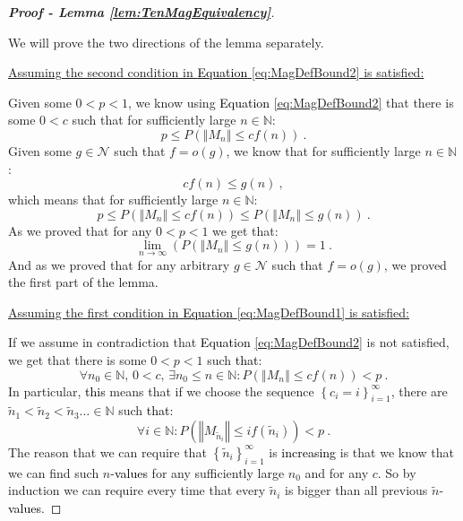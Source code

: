 \documentclass[10pt,a4paper]{amsart}
\begin{document}
\begin{proof}[\textbf{Proof - Lemma \ref{lem:TenMagEquivalency}}]
\

We will prove the two directions of the lemma separately.

\underline{Assuming the second condition in \textcolor{black}{Equation} \ref{eq:MagDefBound2} is satisfied:}

Given some \(0<p<1\), we know using \textcolor{black}{Equation} \ref{eq:MagDefBound2} that there is some \(0<c\) such that for sufficiently large \(n\in\mathbb{N}\):
\begin{equation}
p\leq P\left(\left\Vert M_n\right\Vert \leq cf\left(n\right)\right) \ .
\end{equation}
Given some \(g\in\mathcal{N}\) such that \(f=o(g)\), we know that for sufficiently large \(n\in\mathbb{N}\):
\begin{equation}
cf\left(n\right)\leq g\left(n\right) \ ,
\end{equation}
which means that for sufficiently large \(n\in\mathbb{N}\):
\begin{equation}
p\leq P\left(\left\Vert M_n\right\Vert \leq cf\left(n\right)\right)\leq P\left(\left\Vert M_n\right\Vert \leq g\left(n\right)\right) \ .
\end{equation}
As we proved that for any \(0<p<1\) we get that:
\begin{equation}
\lim_{n\rightarrow\infty}\left(P\left(\left\Vert M_n\right\Vert \leq g\left(n\right)\right)\right)=1 \ .
\end{equation}
And as we proved that for any arbitrary \(g\in\mathcal{N}\) such that \(f=o(g)\), we proved the first part of the lemma.

\underline{Assuming the first condition in \textcolor{black}{Equation} \ref{eq:MagDefBound1} is satisfied:}

If we assume in contradiction that \textcolor{black}{Equation} \ref{eq:MagDefBound2} is not satisfied, we get that there is some \(0<p<1\) such \textcolor{black}{that}:
\begin{equation}
\forall n_{0}\in\mathbb{N},\,0<c,\,\exists n_{0}\leq n\in\mathbb{N}:P\left(\left\Vert M_n\right\Vert \leq cf\left(n\right)\right)<p \ .
\end{equation}
In particular, \textcolor{black}{this} means that if we choose the sequence \(\left\{ c_{i}=i\right\} _{i=1}^{\infty}\), there are \(\tilde{n}_1<\tilde{n}_2<\tilde{n}_3\ldots\in\mathbb{N}\) such \textcolor{black}{that}:
\begin{equation}
    \forall i\in\mathbb{N}:P\left(\left\Vert M_{\tilde{n}_{i}}\right\Vert \leq if\left(\tilde{n}_{i}\right)\right)<p \ .
    \label{eq:Zin:Flin1}
\end{equation}
The reason that we can require that \(\left\{ \tilde{n}_{i}\right\} _{i=1}^{\infty}\) is \textcolor{black}{increasing} is that we know that we can find such \(n\)-\textcolor{black}{values} for any sufficiently large \(n_0\) and for any \(c\). So by induction we can require every time that every \(\tilde{n}_i\) is bigger than all previous \(\tilde{n}\)-\textcolor{black}{values}.


\end{proof}
\end{document}
